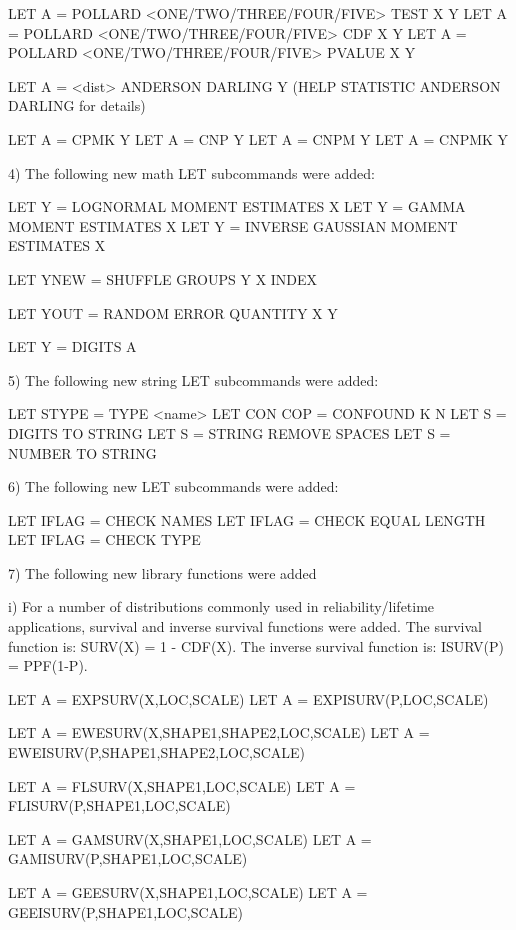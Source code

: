           LET A = POLLARD <ONE/TWO/THREE/FOUR/FIVE> TEST X Y
          LET A = POLLARD <ONE/TWO/THREE/FOUR/FIVE> CDF X Y
          LET A = POLLARD <ONE/TWO/THREE/FOUR/FIVE> PVALUE X Y

          LET A = <dist> ANDERSON DARLING Y
          (HELP STATISTIC ANDERSON DARLING for details)

          LET A = CPMK  Y
          LET A = CNP   Y
          LET A = CNPM  Y
          LET A = CNPMK Y

 4) The following new math LET subcommands were added:

          LET Y = LOGNORMAL MOMENT ESTIMATES X
          LET Y = GAMMA MOMENT ESTIMATES X
          LET Y = INVERSE GAUSSIAN MOMENT ESTIMATES X

          LET YNEW = SHUFFLE GROUPS Y X INDEX

          LET YOUT = RANDOM ERROR QUANTITY X Y

          LET Y = DIGITS A

 5) The following new string LET subcommands were added:

          LET STYPE = TYPE <name>
          LET CON COP = CONFOUND K N
          LET S = DIGITS TO STRING
          LET S = STRING REMOVE SPACES
          LET S = NUMBER TO STRING

 6) The following new LET subcommands were added:

          LET IFLAG = CHECK NAMES
          LET IFLAG = CHECK EQUAL LENGTH
          LET IFLAG = CHECK TYPE

 7) The following new library functions were added

      i) For a number of distributions commonly used in
         reliability/lifetime applications, survival and
         inverse survival functions were added.  The
         survival function is:  SURV(X) = 1 - CDF(X). The
         inverse survival function is: ISURV(P) = PPF(1-P).

          LET A = EXPSURV(X,LOC,SCALE)
          LET A = EXPISURV(P,LOC,SCALE)

          LET A = EWESURV(X,SHAPE1,SHAPE2,LOC,SCALE)
          LET A = EWEISURV(P,SHAPE1,SHAPE2,LOC,SCALE)

          LET A = FLSURV(X,SHAPE1,LOC,SCALE)
          LET A = FLISURV(P,SHAPE1,LOC,SCALE)

          LET A = GAMSURV(X,SHAPE1,LOC,SCALE)
          LET A = GAMISURV(P,SHAPE1,LOC,SCALE)

          LET A = GEESURV(X,SHAPE1,LOC,SCALE)
          LET A = GEEISURV(P,SHAPE1,LOC,SCALE)

